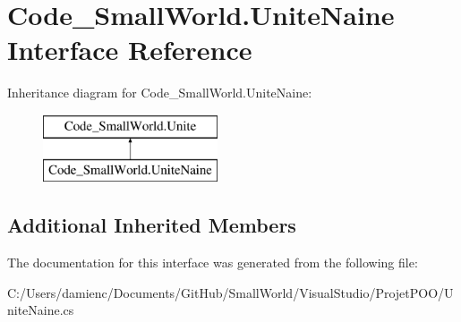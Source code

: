 \hypertarget{interface_code___small_world_1_1_unite_naine}{\section{Code\-\_\-\-Small\-World.\-Unite\-Naine Interface Reference}
\label{interface_code___small_world_1_1_unite_naine}
}
Inheritance diagram for Code\-\_\-\-Small\-World.\-Unite\-Naine\-:\begin{figure}[H]
\begin{center}
\leavevmode
\includegraphics[height=2.000000cm]{interface_code___small_world_1_1_unite_naine}
\end{center}
\end{figure}
\subsection*{Additional Inherited Members}


The documentation for this interface was generated from the following file\-:\begin{DoxyCompactItemize}
\item 
C\-:/\-Users/damienc/\-Documents/\-Git\-Hub/\-Small\-World/\-Visual\-Studio/\-Projet\-P\-O\-O/Unite\-Naine.\-cs\end{DoxyCompactItemize}
